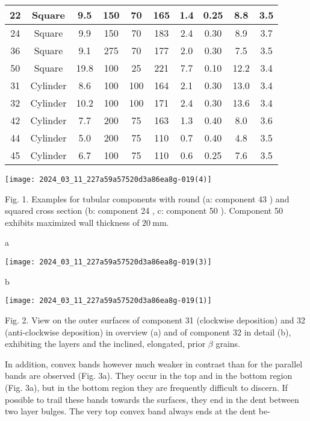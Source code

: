 \documentclass[10pt]{article}
\begin{document}
\begin{center}
\begin{tabular}{|c|c|c|c|c|c|c|c|c|c|}
\hline
22 & Square & 9.5 & 150 & 70 & 165 & 1.4 & 0.25 & 8.8 & 3.5 \\
\hline
24 & Square & 9.9 & 150 & 70 & 183 & 2.4 & 0.30 & 8.9 & 3.7 \\
\hline
36 & Square & 9.1 & 275 & 70 & 177 & 2.0 & 0.30 & 7.5 & 3.5 \\
\hline
50 & Square & 19.8 & 100 & 25 & 221 & 7.7 & 0.10 & 12.2 & 3.4 \\
\hline
31 & Cylinder & 8.6 & 100 & 100 & 164 & 2.1 & 0.30 & 13.0 & 3.4 \\
\hline
32 & Cylinder & 10.2 & 100 & 100 & 171 & 2.4 & 0.30 & 13.6 & 3.4 \\
\hline
42 & Cylinder & 7.7 & 200 & 75 & 163 & 1.3 & 0.40 & 8.0 & 3.6 \\
\hline
44 & Cylinder & 5.0 & 200 & 75 & 110 & 0.7 & 0.40 & 4.8 & 3.5 \\
\hline
45 & Cylinder & 6.7 & 100 & 75 & 110 & 0.6 & 0.25 & 7.6 & 3.5 \\
\hline
\end{tabular}
\end{center}

\begin{center}
\texttt{[image: 2024\_03\_11\_227a59a57520d3a86ea8g-019(4)]}
\end{center}

Fig. 1. Examples for tubular components with round (a: component 43 ) and squared cross section (b: component 24 , c: component 50 ). Component 50 exhibits maximized wall thickness of $20 \mathrm{~mm}$.

a

\begin{center}
\texttt{[image: 2024\_03\_11\_227a59a57520d3a86ea8g-019(3)]}
\end{center}

b

\begin{center}
\texttt{[image: 2024\_03\_11\_227a59a57520d3a86ea8g-019(1)]}
\end{center}

Fig. 2. View on the outer surfaces of component 31 (clockwise deposition) and 32 (anti-clockwise deposition) in overview (a) and of component 32 in detail (b), exhibiting the layers and the inclined, elongated, prior $\beta$ grains.

In addition, convex bands however much weaker in contrast than for the parallel bands are observed (Fig. 3a). They occur in the top and in the bottom region (Fig. 3a), but in the bottom region they are frequently difficult to discern. If possible to trail these bands towards the surfaces, they end in the dent between two layer bulges. The very top convex band always ends at the dent be-
\end{document}
